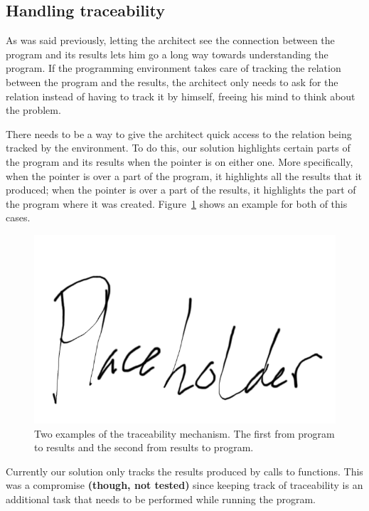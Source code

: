 \subsection{Handling traceability}
As was said previously, letting the architect see the connection between the program and its results lets him go a long way towards understanding the program.
If the programming environment takes care of tracking the relation between the program and the results, the architect only needs to ask for the relation instead of having to track it by himself, freeing his mind to think about the problem.

There needs to be a way to give the architect quick access to the relation being tracked by the environment.
To do this, our solution highlights certain parts of the program and  its results when the pointer is on either one.
More specifically, when the pointer is over a part of the program, it highlights all the results that it produced;
when the pointer is over a part of the results, it highlights the part of the program where it was created.
Figure~\ref{fig:trace:example} shows an example for both of this cases.

\begin{figure}
  \centering
  \includegraphics[width=12cm]{./images/traceability_example}
  \caption{Two examples of the traceability mechanism. The first from program to results and the second from results to program.}
  \label{fig:trace:example}
\end{figure}

Currently our solution only tracks the results produced by calls to functions.
This was a compromise {\bf (though, not tested)} since keeping track of traceability is an additional task that needs to be performed while running the program.

